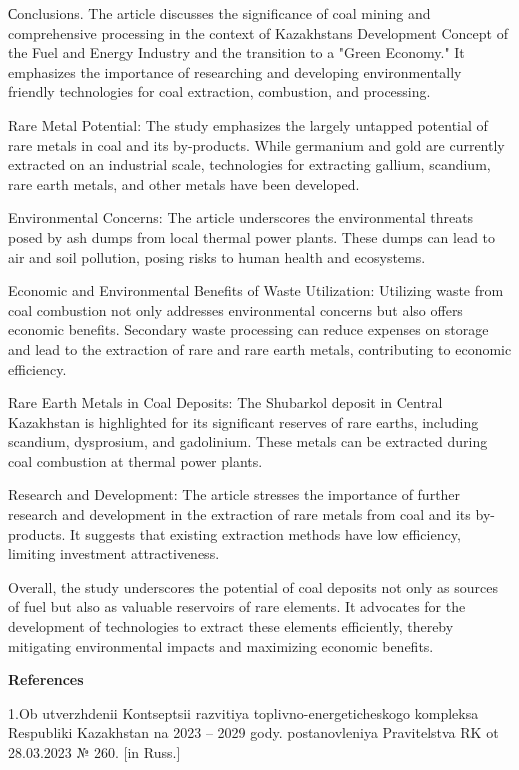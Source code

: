 Сonclusions. The article discusses the significance of coal mining and
comprehensive processing in the context of Kazakhstan\textquotesingle s
Development Concept of the Fuel and Energy Industry and the transition
to a "Green Economy." It emphasizes the importance of researching and
developing environmentally friendly technologies for coal extraction,
combustion, and processing.

Rare Metal Potential: The study emphasizes the largely untapped
potential of rare metals in coal and its by-products. While germanium
and gold are currently extracted on an industrial scale, technologies
for extracting gallium, scandium, rare earth metals, and other metals
have been developed.

Environmental Concerns: The article underscores the environmental
threats posed by ash dumps from local thermal power plants. These dumps
can lead to air and soil pollution, posing risks to human health and
ecosystems.

Economic and Environmental Benefits of Waste Utilization: Utilizing
waste from coal combustion not only addresses environmental concerns but
also offers economic benefits. Secondary waste processing can reduce
expenses on storage and lead to the extraction of rare and rare earth
metals, contributing to economic efficiency.

Rare Earth Metals in Coal Deposits: The Shubarkol deposit in Central
Kazakhstan is highlighted for its significant reserves of rare earths,
including scandium, dysprosium, and gadolinium. These metals can be
extracted during coal combustion at thermal power plants.

Research and Development: The article stresses the importance of further
research and development in the extraction of rare metals from coal and
its by-products. It suggests that existing extraction methods have low
efficiency, limiting investment attractiveness.

Overall, the study underscores the potential of coal deposits not only
as sources of fuel but also as valuable reservoirs of rare elements. It
advocates for the development of technologies to extract these elements
efficiently, thereby mitigating environmental impacts and maximizing
economic benefits.

{\bfseries References}

1.Ob utverzhdenii Kontseptsii razvitiya toplivno-energeticheskogo
kompleksa Respubliki Kazakhstan na 2023 -- 2029 gody. postanovleniya
Pravitel\textquotesingle stva RK ot 28.03.2023 № 260. {[}in Russ.{]}

